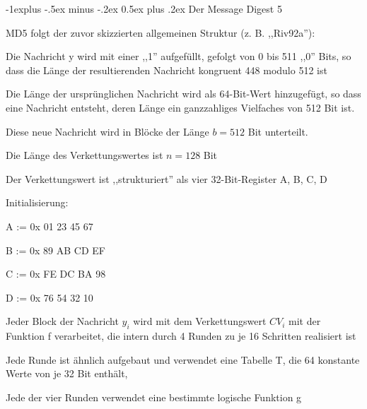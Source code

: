 \documentclass[a4paper]{article}
\makeatletter
\renewcommand{\subsection}{\@startsection{subsection}{2}{0mm}%
 {-1explus -.5ex minus -.2ex}%
 {0.5ex plus .2ex}%
 {\normalfont\normalsize\bfseries}}
\makeatother
\begin{document}
\begin{multicols}{3}
      \subsection{Der Message Digest 5}

      \begin{itemize*}
            \item MD5 folgt der zuvor skizzierten allgemeinen Struktur (z. B.
            ,,Riv92a''):
            \begin{itemize*}
                  \item Die Nachricht y wird mit einer ,,1'' aufgefüllt, gefolgt von 0 bis 511 ,,0'' Bits, so dass die Länge der resultierenden Nachricht kongruent 448 modulo 512 ist
                  \item Die Länge der ursprünglichen Nachricht wird als 64-Bit-Wert hinzugefügt, so dass eine Nachricht entsteht, deren Länge ein ganzzahliges Vielfaches von 512 Bit ist.
                  \item Diese neue Nachricht wird in Blöcke der Länge $b=512$ Bit unterteilt.
                  \item Die Länge des Verkettungswertes ist $n=128$ Bit
                  \begin{itemize*} \item Der Verkettungswert ist ,,strukturiert'' als vier 32-Bit-Register A, B, C, D \item Initialisierung:
                        \begin{itemize*} \item A := 0x 01 23 45 67 \item B := 0x 89 AB CD EF \item C := 0x FE DC BA 98 \item D := 0x 76 54 32 10 \end{itemize*} \end{itemize*}
                  \item Jeder Block der Nachricht $y_i$ wird mit dem Verkettungswert $CV_i$ mit der Funktion f verarbeitet, die intern durch 4 Runden zu je 16 Schritten realisiert ist
                  \begin{itemize*} \item Jede Runde ist ähnlich aufgebaut und verwendet eine Tabelle T, die 64 konstante Werte von je 32 Bit enthält, \item Jede der vier Runden verwendet eine bestimmte logische Funktion g \end{itemize*}
            \end{itemize*}

\end{itemize*}
\end{multicols}
\end{document}
